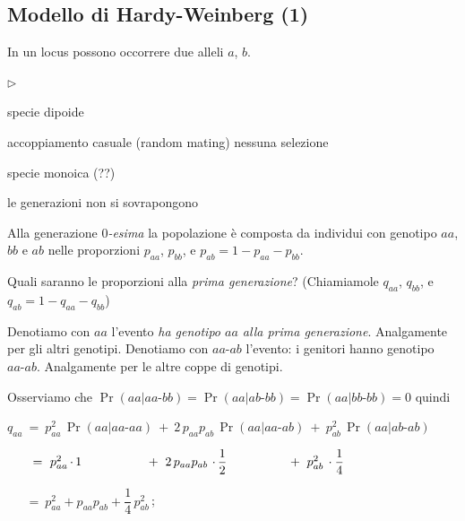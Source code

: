\documentclass[12pt,openany]{book}
\newcommand{\mylabel}[1]{{\footnotesize\textsf{#1}}\hfill}
\newenvironment{citemize}
  {\begin{list}{$\triangleright$}{%
   \setlength{\parskip}{0mm}
   \setlength{\topsep}{.2\baselineskip}
   \setlength{\rightmargin}{0mm}
   \setlength{\listparindent}{0mm}
   \setlength{\itemindent}{0mm}
   \setlength{\labelwidth}{3ex}
   \setlength{\itemsep}{.1\baselineskip}
   \setlength{\parsep}{0mm}
   \setlength{\partopsep}{0mm}
   \setlength{\labelsep}{1ex}
   \setlength{\leftmargin}{\labelwidth+\labelsep}
   \let\makelabel\mylabel}}{%
   \end{list}\vspace*{-1.3mm}}
\theoremstyle{mio}
\theoremstyle{liscio}
\begin{document}
\subsection{Modello di Hardy-Weinberg (1)}
\label{HW_totali1}

In un locus possono occorrere due alleli $a$, $b$. 

\begin{citemize}
\item specie dipoide
\item accoppiamento casuale (random mating) nessuna selezione
\item specie monoica (??)
\item le generazioni non si sovrapongono
\end{citemize}


Alla generazione \textit{$0$-esima\/} la popolazione è composta da individui con genotipo $aa$, $bb$ e $ab$ nelle proporzioni $p_{aa}$, $p_{bb}$, e  $p_{ab}=1-p_{aa}-p_{bb}$.

Quali saranno le proporzioni alla \textit{prima generazione}? (Chiamiamole $q_{aa}$, $q_{bb}$, e $q_{ab}=1-q_{aa}-q_{bb}$)

\def\-{\mbox{-}}

Denotiamo con $aa$ l'evento \textit{ha genotipo $aa$ alla prima generazione}. Analgamente per gli altri genotipi. Denotiamo con $aa\-ab$ l'evento: i genitori hanno genotipo $aa\mbox{-}ab$. Analgamente per le altre coppe di genotipi.

Osserviamo che $\Pr(aa | aa\-bb)=\Pr(aa | ab\-bb)=\Pr(aa | bb\-bb)=0$ quindi

$q_{aa}\ =\ %
p_{aa}^2\, \Pr(aa | aa\-aa)\ +\ 
2\,p_{aa}p_{ab}\, \Pr(aa | aa\-ab)\ +\ 
p^2_{ab}\, \Pr(aa | ab\-ab)$


$\phantom{q_{aa}}\ =\ %
p_{aa}^2\,\rlap{$\cdot\,1$}\phantom{\Pr(aa | aa,aa)}\ +\ 
2\,p_{aa}p_{ab}\, \rlap{$\,\cdot\,\dfrac12$}\ \phantom{\Pr(aa | aa\-ab)}\ +\ 
p^2_{ab}\, \cdot\dfrac14$ 

$\phantom{q_{aa}}\ =\ p_{aa}^2+p_{aa}p_{ab} +\dfrac{1}{4}\,p^2_{ab}\,$;

% 
% 
% 
\end{document}
